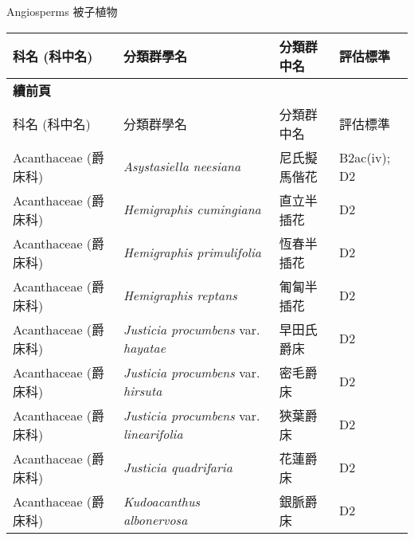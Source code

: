 \noindent\normalfont\selectfont Angiosperms 被子植物
\footnotesize\selectfont
        \begin{longtable}{p{3cm}p{5cm}p{3cm}p{4cm}}
        \toprule
          科名 (科中名) & 分類群學名 & 分類群中名 & 評估標準 \\
        \midrule 
        \endfirsthead

        {{\bfseries 續前頁 }} \\
        科名 (科中名) & 分類群學名 & 分類群中名 & 評估標準 \\
        \midrule
        \endhead
                Acanthaceae (爵床科) & \textit{Asystasiella neesiana}  & 尼氏擬馬偕花 & B2ac(iv); D2 \index{Asystasiella@\textit{Asystasiella}!neesiana@\textit{neesiana}}  \index{尼氏擬馬偕花} \\
    Acanthaceae (爵床科) & \textit{Hemigraphis cumingiana}  & 直立半插花 & D2 \index{Hemigraphis@\textit{Hemigraphis}!cumingiana@\textit{cumingiana}}  \index{直立半插花} \\
    Acanthaceae (爵床科) & \textit{Hemigraphis primulifolia}  & 恆春半插花 & D2 \index{Hemigraphis@\textit{Hemigraphis}!primulifolia@\textit{primulifolia}}  \index{恆春半插花} \\
    Acanthaceae (爵床科) & \textit{Hemigraphis reptans}  & 匍匐半插花 & D2 \index{Hemigraphis@\textit{Hemigraphis}!reptans@\textit{reptans}}  \index{匍匐半插花} \\
    Acanthaceae (爵床科) & \textit{Justicia procumbens} var. \textit{hayatae}  & 早田氏爵床 & D2 \index{Justicia@\textit{Justicia}!procumbens@\textit{procumbens}!var. hayatae@var. \textit{hayatae}}  \index{早田氏爵床} \\
    Acanthaceae (爵床科) & \textit{Justicia procumbens} var. \textit{hirsuta}  & 密毛爵床 & D2 \index{Justicia@\textit{Justicia}!procumbens@\textit{procumbens}!var. hirsuta@var. \textit{hirsuta}}  \index{密毛爵床} \\
    Acanthaceae (爵床科) & \textit{Justicia procumbens} var. \textit{linearifolia}  & 狹葉爵床 & D2 \index{Justicia@\textit{Justicia}!procumbens@\textit{procumbens}!var. linearifolia@var. \textit{linearifolia}}  \index{狹葉爵床} \\
    Acanthaceae (爵床科) & \textit{Justicia quadrifaria}  & 花蓮爵床 & D2 \index{Justicia@\textit{Justicia}!quadrifaria@\textit{quadrifaria}}  \index{花蓮爵床} \\
    Acanthaceae (爵床科) & \textit{Kudoacanthus albonervosa}  & 銀脈爵床 & D2 \index{Kudoacanthus@\textit{Kudoacanthus}!albonervosa@\textit{albonervosa}}  \index{銀脈爵床} \\

\end{longtable}
